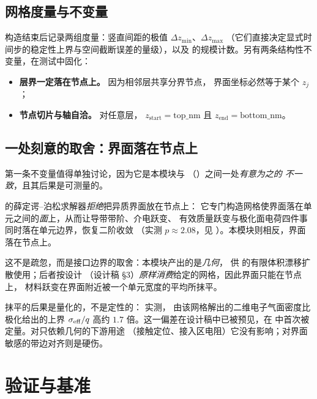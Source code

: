 \subsection{网格度量与不变量}

构造结束后记录两组度量：竖直间距的极值 $\Delta z_{\min}$、$\Delta z_{\max}$
（它们直接决定显式时间步的稳定性上界与空间截断误差的量级），以及
 的规模计数。另有两条结构性不变量，在测试中固化：

\begin{itemize}[leftmargin=1.7em,itemsep=0.3em,topsep=0.35em]
  \item \textbf{层界一定落在节点上。} 因为相邻层共享分界节点，
        界面坐标必然等于某个 $z_j$；
  \item \textbf{节点切片与轴自洽。} 对任意层，
        $z_{\text{start}}=\text{top\_nm}$ 且 $z_{\text{end}}=\text{bottom\_nm}$。
\end{itemize}

\subsection{一处刻意的取舍：界面落在节点上}
\label{sec:mesh-interface}

第一条不变量值得单独讨论，因为它是本模块与
（）之间一处\emph{有意为之的
不一致}，且其后果是可测量的。

 的薛定谔--泊松求解器\emph{拒绝}把异质界面放在节点上：
它专门构造网格使界面落在单元之间的\emph{面}上，从而让导带带阶、介电跃变、
有效质量跃变与极化面电荷四件事同时落在单元边界，恢复二阶收敛
（实测 $p\approx2.08$，见 ）。本模块则相反，界面落在节点上。

这不是疏忽，而是接口边界的取舍：本模块产出的是\emph{几何}，
供 的有限体积漂移扩散使用；后者按设计
（设计稿 §3）\emph{原样消费}给定的网格，因此界面只能在节点上，
材料跃变在界面附近被一个单元宽度的平均所抹平。

抹平的后果是量化的，不是定性的： 实测，
由该网格解出的二维电子气面密度比极化给出的上界
$\sigma_{\mathrm{eff}}/q$ 高约 $1.7$ 倍。这一偏差在设计稿中已被预见，在
 中首次被定量。对只依赖几何的下游用途
（接触定位、接入区电阻）它没有影响；对界面敏感的带边对齐则是硬伤。

\section{验证与基准}
\label{sec:mesh-verification}


